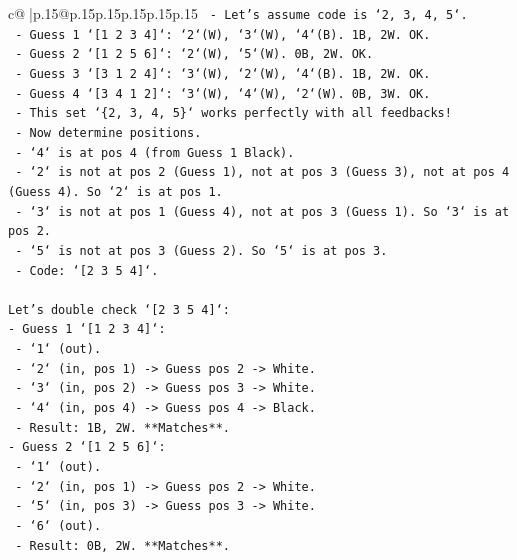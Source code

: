 \documentclass{article}
\begin{document}
{\begin{supertabular}{c@{$\;$}|p{.15\linewidth}@{}p{.15\linewidth}p{.15\linewidth}p{.15\linewidth}p{.15\linewidth}p{.15\linewidth}}
{{{\texttt{        {-} Let's assume code is `2, 3, 4, 5`.} \\
\texttt{        {-} Guess 1 `{[}1 2 3 4{]}`: `2`(W), `3`(W), `4`(B). 1B, 2W. OK.} \\
\texttt{        {-} Guess 2 `{[}1 2 5 6{]}`: `2`(W), `5`(W). 0B, 2W. OK.} \\
\texttt{        {-} Guess 3 `{[}3 1 2 4{]}`: `3`(W), `2`(W), `4`(B). 1B, 2W. OK.} \\
\texttt{        {-} Guess 4 `{[}3 4 1 2{]}`: `3`(W), `4`(W), `2`(W). 0B, 3W. OK.} \\
\texttt{        {-} This set `\{2, 3, 4, 5\}` works perfectly with all feedbacks!} \\
\texttt{        {-} Now determine positions.} \\
\texttt{        {-} `4` is at pos 4 (from Guess 1 Black).} \\
\texttt{        {-} `2` is not at pos 2 (Guess 1), not at pos 3 (Guess 3), not at pos 4 (Guess 4). So `2` is at pos 1.} \\
\texttt{        {-} `3` is not at pos 1 (Guess 4), not at pos 3 (Guess 1). So `3` is at pos 2.} \\
\texttt{        {-} `5` is not at pos 3 (Guess 2). So `5` is at pos 3.} \\
\texttt{        {-} Code: `{[}2 3 5 4{]}`.} \\
\\ 
\texttt{Let's double check `{[}2 3 5 4{]}`:} \\
\texttt{{-} Guess 1 `{[}1 2 3 4{]}`:} \\
\texttt{    {-} `1` (out).} \\
\texttt{    {-} `2` (in, pos 1) {-}> Guess pos 2 {-}> White.} \\
\texttt{    {-} `3` (in, pos 2) {-}> Guess pos 3 {-}> White.} \\
\texttt{    {-} `4` (in, pos 4) {-}> Guess pos 4 {-}> Black.} \\
\texttt{    {-} Result: 1B, 2W. **Matches**.} \\
\texttt{{-} Guess 2 `{[}1 2 5 6{]}`:} \\
\texttt{    {-} `1` (out).} \\
\texttt{    {-} `2` (in, pos 1) {-}> Guess pos 2 {-}> White.} \\
\texttt{    {-} `5` (in, pos 3) {-}> Guess pos 3 {-}> White.} \\
\texttt{    {-} `6` (out).} \\
\texttt{    {-} Result: 0B, 2W. **Matches**.} \\
}}}
\end{supertabular}}
\end{document}
